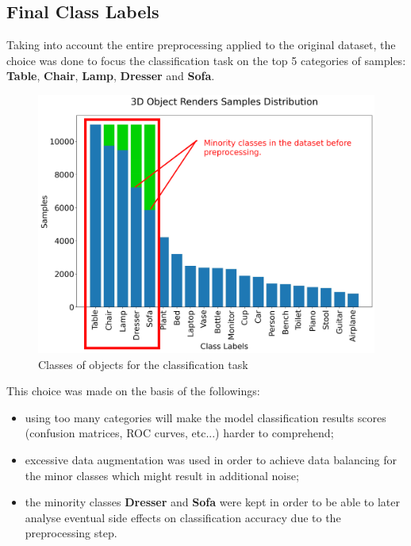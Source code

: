 \documentclass[11pt,a4paper]{article}
\begin{document}
\subsection{Final Class Labels}
Taking into account the entire preprocessing applied to the original dataset, the choice was done to focus the classification task on the top 5 categories of samples: \textbf{Table}, \textbf{Chair}, \textbf{Lamp}, \textbf{Dresser} and \textbf{Sofa}.
\begin{figure}[H]
    \centering
    \includegraphics[scale=0.42]{imgs/selected-categories.jpg}
    \caption{Classes of objects for the classification task}
\end{figure}
This choice was made on the basis of the followings:
\begin{itemize}
    \item using too many categories will make the model classification results scores (confusion matrices, ROC curves, etc...) harder to comprehend;
    \item excessive data augmentation was used in order to achieve data balancing for the minor classes which might result in additional noise;
    \item the minority classes \textbf{Dresser} and \textbf{Sofa} were kept in order to be able to later analyse eventual side effects on classification accuracy due to the preprocessing step.
\end{itemize}
\end{document}

